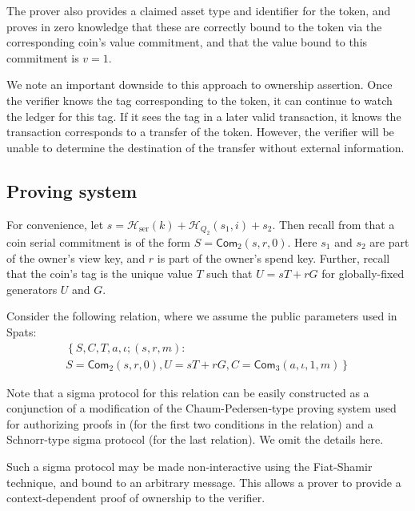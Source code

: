\documentclass{article}
\newcommand{\func}[1]{\mathsf{#1}}
\newcommand{\com}{\func{Com}}
\newcommand{\hash}{\mathcal{H}}
\begin{document}
The prover also provides a claimed asset type and identifier for the token, and proves in zero knowledge that these are correctly bound to the token via the corresponding coin's value commitment, and that the value bound to this commitment is $v = 1$.

We note an important downside to this approach to ownership assertion.
Once the verifier knows the tag corresponding to the token, it can continue to watch the ledger for this tag.
If it sees the tag in a later valid transaction, it knows the transaction corresponds to a transfer of the token.
However, the verifier will be unable to determine the destination of the transfer without external information.


\subsection{Proving system}

For convenience, let $s = \hash_{\text{ser}}(k) + \hash_{Q_2}(s_1, i) + s_2$.
Then recall from \cite{spark} that a coin serial commitment is of the form $S = \com_2(s, r, 0)$.
Here $s_1$ and $s_2$ are part of the owner's view key, and $r$ is part of the owner's spend key.
Further, recall that the coin's tag is the unique value $T$ such that $U = sT + rG$ for globally-fixed generators $U$ and $G$.

Consider the following relation, where we assume the public parameters used in Spats:
\begin{multline*}
    \left\{ S, C, T, a, \iota ; (s, r, m) : \right. \\
    \left. S = \com_2(s, r, 0), U = sT + rG, C = \com_3(a, \iota, 1, m) \right\}
\end{multline*}

Note that a sigma protocol for this relation can be easily constructed as a conjunction of a modification of the Chaum-Pedersen-type proving system used for authorizing proofs in \cite{spark} (for the first two conditions in the relation) and a Schnorr-type sigma protocol (for the last relation).
We omit the details here.

Such a sigma protocol may be made non-interactive using the Fiat-Shamir technique, and bound to an arbitrary message.
This allows a prover to provide a context-dependent proof of ownership to the verifier.




\end{document}
